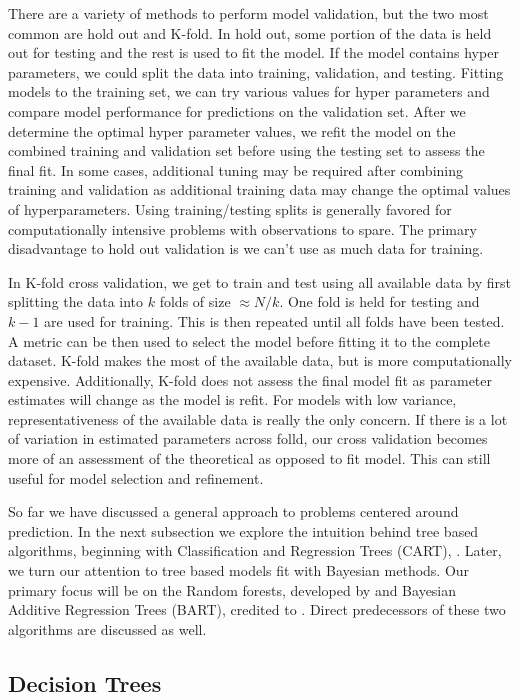 \documentclass[
  12pt,
  letterpaper,
  DIV=11,
  numbers=noendperiod]{scrartcl}
\begin{document}
There are a variety of methods to perform model validation, but the two
most common are hold out and K-fold. In hold out, some portion of the
data is held out for testing and the rest is used to fit the model. If
the model contains hyper parameters, we could split the data into
training, validation, and testing. Fitting models to the training set,
we can try various values for hyper parameters and compare model
performance for predictions on the validation set. After we determine
the optimal hyper parameter values, we refit the model on the combined
training and validation set before using the testing set to assess the
final fit. In some cases, additional tuning may be required after
combining training and validation as additional training data may change
the optimal values of hyperparameters. Using training/testing splits is
generally favored for computationally intensive problems with
observations to spare. The primary disadvantage to hold out validation
is we can't use as much data for training.

In K-fold cross validation, we get to train and test using all available
data by first splitting the data into \(k\) folds of size
\(\approx N/k\). One fold is held for testing and \(k-1\) are used for
training. This is then repeated until all folds have been tested. A
metric can be then used to select the model before fitting it to the
complete dataset. K-fold makes the most of the available data, but is
more computationally expensive. Additionally, K-fold does not assess the
final model fit as parameter estimates will change as the model is
refit. For models with low variance, representativeness of the available
data is really the only concern. If there is a lot of variation in
estimated parameters across folld, our cross validation becomes more of
an assessment of the theoretical as opposed to fit model. This can still
useful for model selection and refinement.

So far we have discussed a general approach to problems centered around
prediction. In the next subsection we explore the intuition behind tree
based algorithms, beginning with Classification and Regression Trees
(CART), \citep{cart}. Later, we turn our attention to tree based models
fit with Bayesian methods. Our primary focus will be on the Random
forests, developed by \citep{random_forest} and Bayesian Additive
Regression Trees (BART), credited to \citep{bart_paper}. Direct
predecessors of these two algorithms are discussed as well.

\subsection{Decision Trees}\label{decision-trees}
\end{document}
